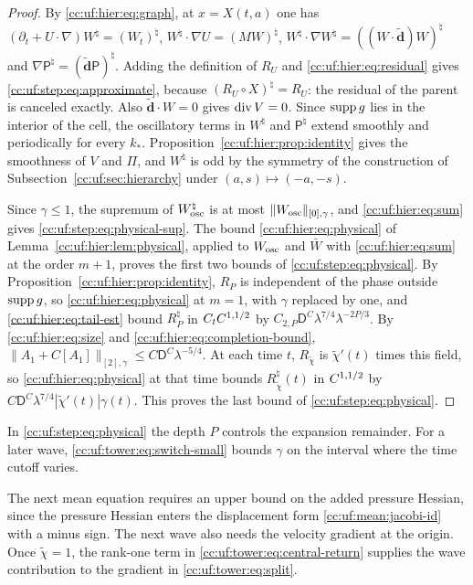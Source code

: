 \begin{proof}
By \eqref{cc:uf:hier:eq:graph}, at \(x=X(t,a)\) one has
\((\partial_t+U\cdot\nabla)W^\natural=(W_t)^\natural\),
\(W^\natural\cdot\nabla U=(MW)^\natural\),
\(W^\natural\cdot\nabla W^\natural=((W\cdot\widetilde{\mathbf d})W)^\natural\) and
\(\nabla\mathsf P^\natural=(\widetilde{\mathbf d}\mathsf P)^\natural\). Adding
the definition of \(R_U\) and \eqref{cc:uf:hier:eq:residual} gives
\eqref{cc:uf:step:eq:approximate}, because \((R_U\circ X)^\natural=R_U\):
the residual of the parent is canceled exactly. Also
\(\widetilde{\mathbf d}\cdot W=0\) gives \(\operatorname{div} V=0\).
Since \(\operatorname{supp} g\) lies in the interior of the cell, the oscillatory
terms in \(W^\natural\) and \(\mathsf P^\natural\) extend smoothly and
periodically for every \(k_*\). Proposition~\ref{cc:uf:hier:prop:identity}
gives the smoothness of \(V\) and \(\Pi\), and \(W^\natural\) is odd by
the symmetry of the construction of Subsection~\ref{cc:uf:sec:hierarchy}
under \((a,s)\mapsto(-a,-s)\).

Since $\gamma\le1$, the supremum of
$W_{\rm osc}^\natural$ is at most $\|W_{\rm osc}\|_{[0],\gamma}$, and
\eqref{cc:uf:hier:eq:sum} gives \eqref{cc:uf:step:eq:physical-sup}.
The bound \eqref{cc:uf:hier:eq:physical} of
Lemma~\ref{cc:uf:hier:lem:physical}, applied to $W_{\rm osc}$ and
$\bar W$ with \eqref{cc:uf:hier:eq:sum} at the order $m+1$, proves the
first two bounds of \eqref{cc:uf:step:eq:physical}.
By Proposition~\ref{cc:uf:hier:prop:identity}, $R_P$ is independent of
the phase outside $\operatorname{supp} g$, so \eqref{cc:uf:hier:eq:physical} at $m=1$,
with $\gamma$ replaced by one, and \eqref{cc:uf:hier:eq:tail-est} bound
$R_P^\natural$ in $C_tC^{1,1/2}$ by
$C_{2,P}\mathsf D^C\lambda^{7/4}\lambda^{-2P/3}$. By
\eqref{cc:uf:hier:eq:size} and \eqref{cc:uf:hier:eq:completion-bound},
$\|A_1+C[A_1]\|_{[2],\gamma}\le C\mathsf D^C\lambda^{-5/4}$. At each time
$t$, $R_{\widetilde\chi}$ is $\widetilde\chi'(t)$ times this field, so
\eqref{cc:uf:hier:eq:physical} at that time bounds
$R_{\widetilde\chi}^\natural(t)$ in $C^{1,1/2}$ by
$C\mathsf D^C\lambda^{7/4}|\widetilde\chi'(t)|\gamma(t)$. This proves
the last bound of \eqref{cc:uf:step:eq:physical}.
\end{proof}

In \eqref{cc:uf:step:eq:physical} the depth $P$ controls the expansion
remainder. For a later wave, \eqref{cc:uf:tower:eq:switch-small}
bounds $\gamma$ on the interval where the time cutoff varies.

The next mean equation requires an upper bound on the added pressure
Hessian, since the pressure Hessian enters the displacement form
\eqref{cc:uf:mean:jacobi-id} with a minus sign. The next wave also needs
the velocity gradient at the origin. Once $\widetilde\chi=1$, the
rank-one term in \eqref{cc:uf:tower:eq:central-return} supplies the
wave contribution to the gradient in \eqref{cc:uf:tower:eq:split}.

